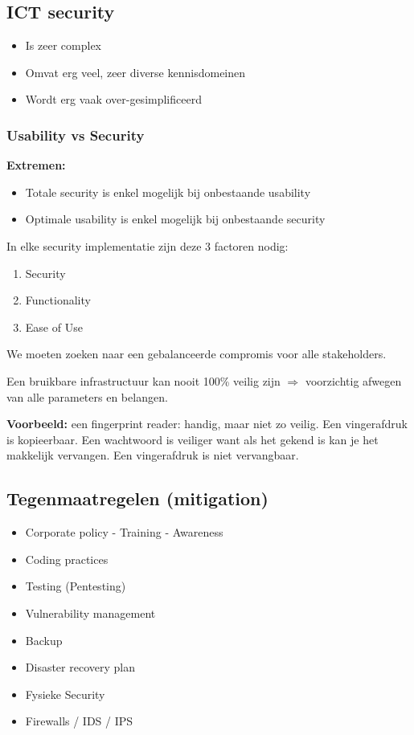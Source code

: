\documentclass{article}
\newcommand{\bold}[1]{\textbf{#1}}
\begin{document}
\subsection{ICT security}
\begin{itemize}
    \item Is zeer complex
    \item Omvat erg veel, zeer diverse kennisdomeinen
    \item Wordt erg vaak over-gesimplificeerd
\end{itemize}

\subsubsection{Usability vs Security}
\bold{Extremen:}

\begin{itemize}
    \item Totale security is enkel mogelijk bij onbestaande usability
    \item Optimale usability is enkel mogelijk bij onbestaande security
\end{itemize}

In elke security implementatie zijn deze 3 factoren nodig:

\begin{enumerate}
    \item Security 
    \item Functionality
    \item Ease of Use
\end{enumerate}

We moeten zoeken naar een gebalanceerde compromis voor alle stakeholders.

Een bruikbare infrastructuur kan nooit 100\% veilig zijn $\Rightarrow$ voorzichtig afwegen van alle parameters en belangen.

\bold{Voorbeeld: } een fingerprint reader: handig, maar niet zo veilig. Een vingerafdruk is kopieerbaar.
Een wachtwoord is veiliger want als het gekend is kan je het makkelijk vervangen. Een vingerafdruk is niet vervangbaar.

\subsection{Tegenmaatregelen (mitigation)}

\begin{itemize}
    \item Corporate policy  - Training  - Awareness
    \item Coding practices
    \item Testing (Pentesting)
    \item Vulnerability management
    \item Backup
    \item Disaster recovery plan
    \item Fysieke Security
    \item Firewalls / IDS / IPS
\end{itemize}
\end{document}
